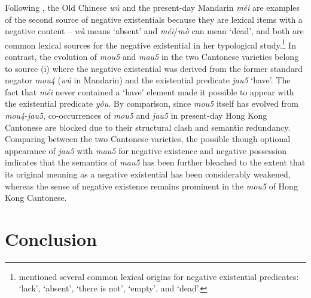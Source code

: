 \documentclass[output=paper]{langscibook}
\begin{document}
Following \cite{Veselinova2013}, the Old Chinese \textit{wù} and the present-day Mandarin \textit{méi} are examples of the second source of negative existentials because they are lexical items with a negative content – \textit{wù} means `absent' and \textit{méi}/\textit{mò} can mean `dead', and both are common lexical sources for the negative existential in her typological study.\footnote{\cite{Veselinova2013} mentioned several common lexical origins for negative existential predicates: `lack', `absent', `there is not', `empty', and `dead'.} 
In contrast, the evolution of \textit{mou5} and \textit{mau5} in the two Cantonese varieties belong to source (i) where the negative existential was derived from the former standard negator \textit{mou4} (\textit{wú} in Mandarin) and the existential predicate \textit{jau5} `have'. The fact that \textit{méi} never contained a `have' element made it possible to appear with the existential predicate \textit{yǒu}. By comparison, since \textit{mou5} itself has evolved from \textit{mou4}-\textit{jau5}, co-occurrences of \textit{mou5} and \textit{jau5} in present-day Hong Kong Cantonese are blocked due to their structural clash and semantic redundancy. Comparing between the two Cantonese varieties, the possible though optional appearance of \textit{jau5} with \textit{mau5} for negative existence and negative possession indicates that the semantics of \textit{mau5} has been further bleached to the extent that its original meaning as a negative existential has been considerably weakened, whereas the sense of negative existence remains prominent in the \textit{mou5} of Hong Kong Cantonese.



\section{Conclusion}\label{s:lam6}
\end{document}

